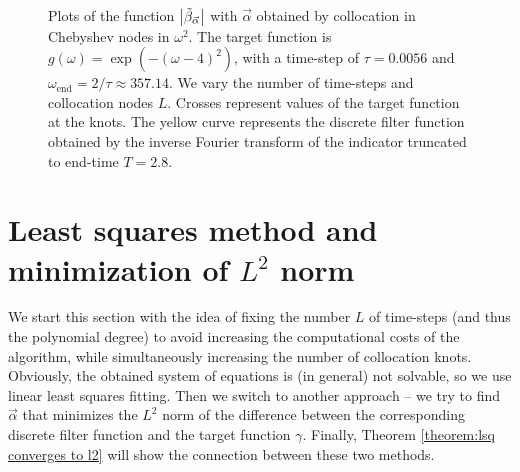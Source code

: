 \documentclass[a4paper,11pt,bibliography=totoc,listof=totoc,headinclude=true,cleardoublepage=empty,oneside]{scrbook}
\newcommand{\dffv}{\Tilde{\beta}_{\Vec{\alpha}}}
\newcommand{\e}{\mathrm{end}}
\begin{document}
\begin{figure}[h]
    \caption{Plots of the function $\left|\dffv\right|$ with $\Vec{\alpha}$ obtained by collocation in Chebyshev nodes in $\omega^2$. The target function is $g(\omega) = \exp\left(-(\omega-4)^2\right)$, with a time-step of $\tau = 0.0056$ and $\omega_\e = 2/\tau \approx 357.14$. We vary the number of time-steps and collocation nodes $L$. Crosses represent values of the target function at the knots. The yellow curve represents the discrete filter function obtained by the inverse Fourier transform of the indicator truncated to end-time $T=2.8$.}
    \label{fig:cheb coll cont ex}
\end{figure}


\section{Least squares method and minimization of $L^2$ norm}
We start this section with the idea of fixing the number $L$ of time-steps (and thus the polynomial degree) to avoid increasing the computational costs of the algorithm, while simultaneously increasing the number of collocation knots. Obviously, the obtained system of equations is (in general) not solvable, so we use linear least squares fitting. Then we switch to another approach -- we try to find $\Vec{\alpha}$ that minimizes the $L^2$ norm of the difference between the corresponding discrete filter function and the target function $\gamma$. Finally, Theorem \ref{theorem:lsq converges to l2} will show the connection between these two methods.
\end{document}
